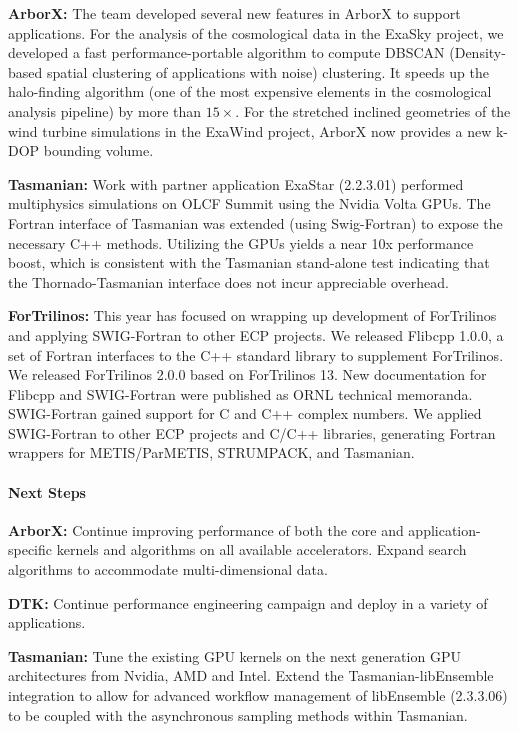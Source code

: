 {\bf ArborX:} The team developed several new features in ArborX to support
applications. For the analysis of the cosmological data in the ExaSky
project, we developed a fast performance-portable algorithm to compute DBSCAN
(Density-based spatial clustering of applications with noise) clustering. It
speeds up the halo-finding algorithm (one of the most expensive elements in the
cosmological analysis pipeline) by more than $15\times$. For the stretched
inclined geometries of the wind turbine simulations in the ExaWind project,
ArborX now provides a new k-DOP bounding volume.

{\bf Tasmanian:} Work with partner application ExaStar (2.2.3.01) performed
multiphysics simulations on OLCF Summit using the Nvidia Volta GPUs.
The Fortran interface of Tasmanian was extended (using Swig-Fortran)
to expose the necessary C++ methods. Utilizing the GPUs yields a near 10x
performance boost, which is consistent with the Tasmanian stand-alone test
indicating that the Thornado-Tasmanian interface does not incur appreciable
overhead.

{\bf ForTrilinos:} This year has focused on wrapping up development of
ForTrilinos and applying SWIG-Fortran to other ECP projects. We released Flibcpp
1.0.0, a set of Fortran interfaces to the C++ standard library to supplement
ForTrilinos. We released ForTrilinos 2.0.0 based on ForTrilinos 13. New
documentation for Flibcpp and SWIG-Fortran were published as ORNL technical
memoranda. SWIG-Fortran gained support for C and C++ complex numbers.
We applied SWIG-Fortran to other ECP projects and C/C++ libraries, generating
Fortran wrappers for METIS/ParMETIS, STRUMPACK, and Tasmanian.


\paragraph{Next Steps}

\indent

{\bf ArborX:} Continue improving performance of both the core and
application-specific kernels and algorithms on all available accelerators.
Expand search algorithms to accommodate multi-dimensional data.

{\bf DTK:} Continue performance engineering campaign and deploy in a variety of
applications.

{\bf Tasmanian:} Tune the existing GPU kernels on the next generation
GPU architectures from Nvidia, AMD and Intel.
Extend the Tasmanian-libEnsemble integration to allow for advanced workflow
management of libEnsemble (2.3.3.06) to be coupled with the asynchronous sampling
methods within Tasmanian.


